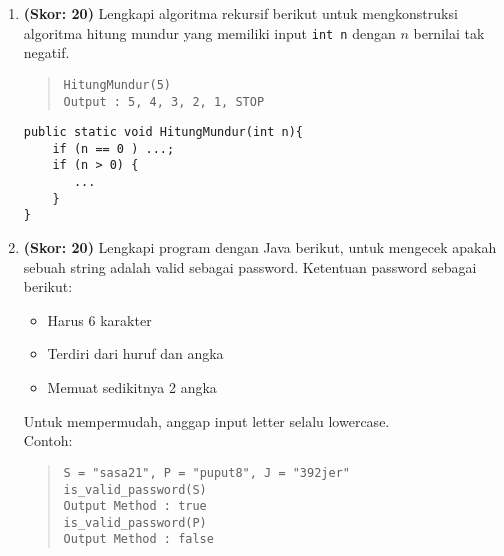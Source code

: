 \documentclass[10pt,openany,a4paper]{article}
\begin{document}
\begin{enumerate}
    \item \textbf{(Skor: 20)} Lengkapi algoritma rekursif berikut untuk mengkonstruksi algoritma hitung mundur yang memiliki input \texttt{int n} dengan $n$ bernilai tak negatif.
    \begin{quote}
        \noindent
        \texttt{{\color{blue}HitungMundur}(5)\\
        Output : 5, 4, 3, 2, 1, STOP}
    \end{quote}
    \begin{verbatim}
public static void HitungMundur(int n){
    if (n == 0 ) ...;
    if (n > 0) {
       ...
    }	    
}
    \end{verbatim}
    
    \item \textbf{(Skor: 20)} Lengkapi program dengan Java berikut, untuk mengecek apakah sebuah string adalah valid sebagai password. Ketentuan password sebagai berikut:
\begin{itemize}
    \item Harus 6 karakter
    \item Terdiri dari huruf dan angka
    \item Memuat sedikitnya 2 angka
\end{itemize}
Untuk mempermudah, anggap input letter selalu lowercase.\\
Contoh:
\begin{quote}
\noindent
\texttt{S = {\color{red}"sasa21"}, P = {\color{red}"puput8"},  J = {\color{red}"392jer"}}\\

\texttt{{\color{blue}is\_valid\_password}(S) \\
Output Method : true}\\

\texttt{{\color{blue}is\_valid\_password}(P)\\ 
Output Method : false}\\


\end{quote}
\end{enumerate}
\end{document}
